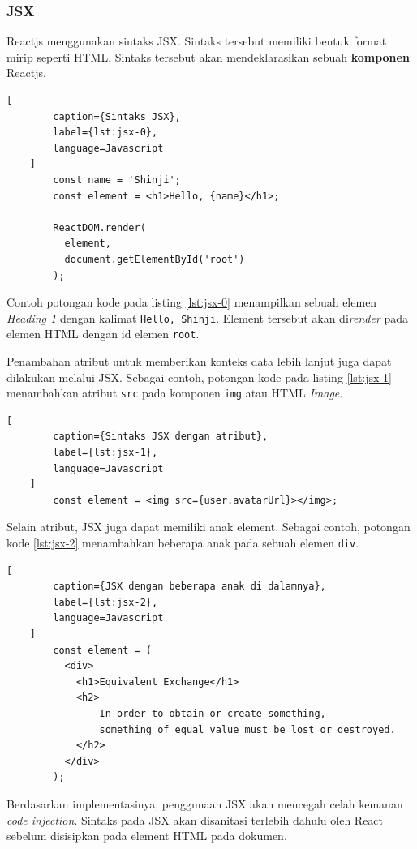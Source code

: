     \subsubsection{JSX}
    Reactjs menggunakan sintaks JSX. Sintaks tersebut memiliki bentuk format mirip seperti HTML. Sintaks tersebut akan mendeklarasikan sebuah \textbf{komponen} Reactjs.
    \begin{lstlisting}[
        caption={Sintaks JSX}, 
        label={lst:jsx-0}, 
        language=Javascript
    ]
        const name = 'Shinji';
        const element = <h1>Hello, {name}</h1>;
        
        ReactDOM.render(
          element,
          document.getElementById('root')
        );
    \end{lstlisting}
    
    Contoh potongan kode pada listing \ref{lst:jsx-0} menampilkan sebuah elemen \textit{Heading 1} dengan kalimat \texttt{Hello, Shinji}. Element tersebut akan di\textit{render} pada elemen HTML dengan id elemen \texttt{root}.
    
    Penambahan atribut untuk memberikan konteks data lebih lanjut juga dapat dilakukan melalui JSX. Sebagai contoh, potongan kode pada listing \ref{lst:jsx-1} menambahkan atribut \texttt{src} pada komponen \texttt{img} atau HTML \textit{Image}.
    
    \begin{lstlisting}[
        caption={Sintaks JSX dengan atribut}, 
        label={lst:jsx-1}, 
        language=Javascript
    ]
        const element = <img src={user.avatarUrl}></img>;
    \end{lstlisting}
    
        
    Selain atribut, JSX juga dapat memiliki anak element. Sebagai contoh, potongan kode \ref{lst:jsx-2} menambahkan beberapa anak pada sebuah elemen \texttt{div}.
    \begin{lstlisting}[
        caption={JSX dengan beberapa anak di dalamnya}, 
        label={lst:jsx-2}, 
        language=Javascript
    ]
        const element = (
          <div>
            <h1>Equivalent Exchange</h1>
            <h2>
                In order to obtain or create something,
                something of equal value must be lost or destroyed.
            </h2>
          </div>
        );
    \end{lstlisting}
    
    Berdasarkan implementasinya, penggunaan JSX akan mencegah celah kemanan \textit{code injection}. Sintaks pada JSX akan disanitasi terlebih dahulu oleh React sebelum disisipkan pada element HTML pada dokumen.
    
